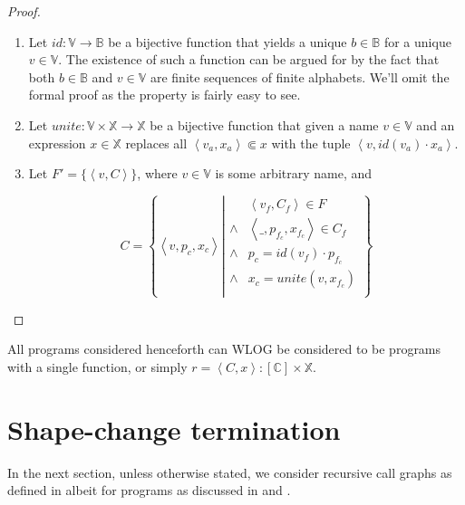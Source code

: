 \begin{proof}\ \\

\begin{enumerate}

\item Let $id : \mathbb{V} \rightarrow \mathbb{B}$ be a bijective function that
yields a unique $b\in\mathbb{B}$ for a unique $v\in\mathbb{V}$. The existence
of such a function can be argued for by the fact that both $b\in\mathbb{B}$ and
$v\in\mathbb{V}$ are finite sequences of finite alphabets. We'll omit the
formal proof as the property is fairly easy to see.

\item Let $unite : \mathbb{V} \times \mathbb{X} \rightarrow \mathbb{X}$ be a
bijective function that given a name $v\in\mathbb{V}$ and an expression
$x\in\mathbb{X}$ replaces all $\left\langle v_a, x_a \right\rangle\Subset x$
with the tuple $\left\langle v, id(v_a)\cdot x_a \right\rangle$.

\item Let $F'=\{ \left\langle v,C \right\rangle \}$, where $v\in\mathbb{V}$ is
some arbitrary name, and

$$C = \left\{ \left\langle v, p_c, x_c \right\rangle \left| 
\begin{array}{ll}
&\left\langle v_f,C_f\right\rangle\in F\\
\wedge &\left\langle \_, p_{f_c}, x_{f_c} \right\rangle \in C_f\\
\wedge &p_c = id(v_f)\cdot p_{f_c}\\
\wedge &x_c = unite(v,x_{f_c})\\
\end{array}
\right.\right\}$$

\end{enumerate}\end{proof}

\begin{definition}\label{definition:program-many-to-one} All programs
considered henceforth can WLOG be considered to be programs with a single
function, or simply $r = \left\langle C, x\right\rangle : [\mathbb{C}] \times
\mathbb{X}$.\end{definition}

\section{Shape-change termination}

In the next section, unless otherwise stated, we consider recursive call graphs
as defined in  albeit for programs as
discussed in  and
.

